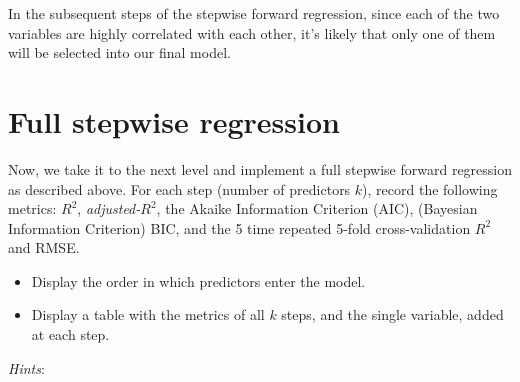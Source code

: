\documentclass[
]{book}
\begin{document}
In the subsequent steps of the stepwise forward regression, since each of the two variables are highly correlated with each other, it's likely that only one of them will be selected into our final model.

\hypertarget{full-stepwise-regression-1}{%
\section{Full stepwise regression}\label{full-stepwise-regression-1}}

Now, we take it to the next level and implement a full stepwise forward regression as described above. For each step (number of predictors \(k\)), record the following metrics: \(R^2\), \emph{adjusted-}\(R^2\), the Akaike Information Criterion (AIC), (Bayesian Information Criterion) BIC, and the 5 time repeated 5-fold cross-validation \(R^2\) and RMSE.

\begin{itemize}
\item
  Display the order in which predictors enter the model.
\item
  Display a table with the metrics of all \(k\) steps, and the single variable, added at each step.
\end{itemize}

\emph{Hints}:
\end{document}

